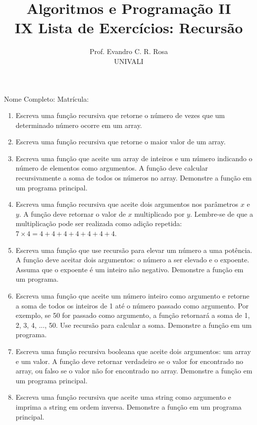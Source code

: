 \documentclass[12pt]{article}
\title{Algoritmos e Programação II\\
\large IX Lista de Exercícios: Recursão}
\author{Prof. Evandro C. R. Rosa\\UNIVALI}
\date{}
\begin{document}
\maketitle

\noindent Nome Completo: \underline{\hspace{8cm}} Matrícula: \underline{\hspace{2.4cm}}
\begin{enumerate}
  \item Escreva uma função recursiva que retorne o número de vezes que um determinado número ocorre em um array.
  \item Escreva uma função recursiva que retorne o maior valor de um array.
  \item Escreva uma função que aceite um array de inteiros e um número indicando o número de elementos como argumentos. A função deve calcular recursivamente a soma de todos os números no array. Demonstre a função em um programa principal.
  \item Escreva uma função recursiva que aceite dois argumentos nos parâmetros \( x \) e \( y \). A função deve retornar o valor de \( x \) multiplicado por \( y \). Lembre-se de que a multiplicação pode ser realizada como adição repetida: \( 7 \times 4 = 4 + 4 + 4 + 4 + 4 + 4 + 4 \).
  \item Escreva uma função que use recursão para elevar um número a uma potência. A função deve aceitar dois argumentos: o número a ser elevado e o expoente. Assuma que o expoente é um inteiro não negativo. Demonstre a função em um programa.
  \item Escreva uma função que aceite um número inteiro como argumento e retorne a soma de todos os inteiros de 1 até o número passado como argumento. Por exemplo, se 50 for passado como argumento, a função retornará a soma de 1, 2, 3, 4, ..., 50. Use recursão para calcular a soma. Demonstre a função em um programa.
  \item Escreva uma função recursiva booleana que aceite dois argumentos: um array e um valor. A função deve retornar verdadeiro se o valor for encontrado no array, ou falso se o valor não for encontrado no array. Demonstre a função em um programa principal.
  \item Escreva uma função recursiva que aceite uma string como argumento e imprima a string em ordem inversa. Demonstre a função em um programa principal.
\end{enumerate}
\end{document}
